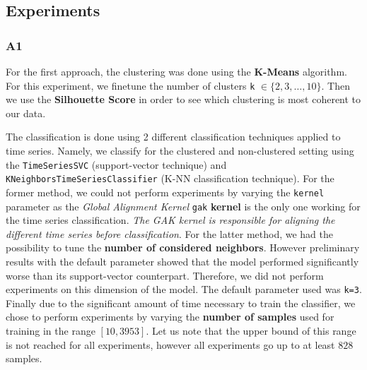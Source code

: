 \documentclass[sigplan,screen]{acmart}
\begin{document}
\subsection{Experiments}
\subsubsection{A1}
For the first approach, the clustering was done using the \textbf{K-Means} algorithm. For this experiment, we finetune the number of clusters \texttt{k} $\in \{2,3,\ldots, 10\}$. Then we use the \textbf{Silhouette Score} in order to see which clustering is most coherent to our data. %

The classification is done using 2 different classification techniques applied to time series. Namely, we classify for the clustered and non-clustered setting using the \texttt{TimeSeriesSVC} (support-vector technique) and \\ \texttt{KNeighborsTimeSeriesClassifier} (K-NN classification technique). For the former method, we could not perform experiments by varying the \texttt{kernel} parameter as the \textit{Global Alignment Kernel} \texttt{gak} \textbf{kernel} is the only one working for the time series classification. \textit{The GAK kernel is responsible for aligning the different time series before classification}. For the latter method, we had the possibility to tune the \textbf{number of considered neighbors}. However preliminary results with the default parameter showed that the model performed significantly worse than its support-vector counterpart. Therefore, we did not perform experiments on this dimension of the model. The default parameter used was \texttt{k=3}. Finally due to the significant amount of time necessary to train the classifier, we chose to perform experiments by varying the \textbf{number of samples} used for training in the range $[10, 3953]$. Let us note that the upper bound of this range is not reached for all experiments, however all experiments go up to at least $828$ samples.
\end{document}
